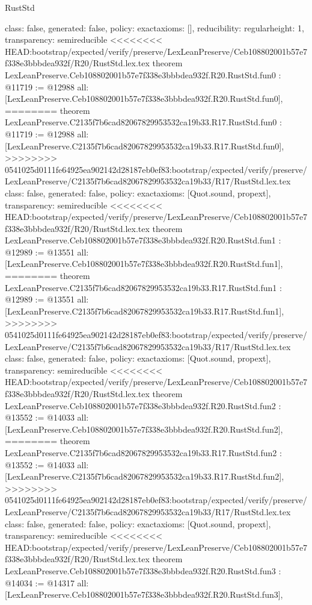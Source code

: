 \begin{lexlean}{RustStd}
\begin{coremodule}
{\begin{coremodule}
{{{  class: false,
  generated: false,
  policy: exact{axioms: []},
  reducibility: regular{height: 1},
  transparency: semireducible
}
<<<<<<<< HEAD:bootstrap/expected/verify/preserve/LexLeanPreserve/Ceb108802001b57e7f338e3bbbdea932f/R20/RustStd.lex.tex
theorem LexLeanPreserve.Ceb108802001b57e7f338e3bbbdea932f.R20.RustStd.fun0 : @11719 := @12988 {
  all: [LexLeanPreserve.Ceb108802001b57e7f338e3bbbdea932f.R20.RustStd.fun0],
========
theorem LexLeanPreserve.C2135f7b6cad82067829953532ca19b33.R17.RustStd.fun0 : @11719 := @12988 {
  all: [LexLeanPreserve.C2135f7b6cad82067829953532ca19b33.R17.RustStd.fun0],
>>>>>>>> 0541025d0111fe64925ea902142d28187eb0ef83:bootstrap/expected/verify/preserve/LexLeanPreserve/C2135f7b6cad82067829953532ca19b33/R17/RustStd.lex.tex
  class: false,
  generated: false,
  policy: exact{axioms: [Quot.sound, propext]},
  transparency: semireducible
}
<<<<<<<< HEAD:bootstrap/expected/verify/preserve/LexLeanPreserve/Ceb108802001b57e7f338e3bbbdea932f/R20/RustStd.lex.tex
theorem LexLeanPreserve.Ceb108802001b57e7f338e3bbbdea932f.R20.RustStd.fun1 : @12989 := @13551 {
  all: [LexLeanPreserve.Ceb108802001b57e7f338e3bbbdea932f.R20.RustStd.fun1],
========
theorem LexLeanPreserve.C2135f7b6cad82067829953532ca19b33.R17.RustStd.fun1 : @12989 := @13551 {
  all: [LexLeanPreserve.C2135f7b6cad82067829953532ca19b33.R17.RustStd.fun1],
>>>>>>>> 0541025d0111fe64925ea902142d28187eb0ef83:bootstrap/expected/verify/preserve/LexLeanPreserve/C2135f7b6cad82067829953532ca19b33/R17/RustStd.lex.tex
  class: false,
  generated: false,
  policy: exact{axioms: [Quot.sound, propext]},
  transparency: semireducible
}
<<<<<<<< HEAD:bootstrap/expected/verify/preserve/LexLeanPreserve/Ceb108802001b57e7f338e3bbbdea932f/R20/RustStd.lex.tex
theorem LexLeanPreserve.Ceb108802001b57e7f338e3bbbdea932f.R20.RustStd.fun2 : @13552 := @14033 {
  all: [LexLeanPreserve.Ceb108802001b57e7f338e3bbbdea932f.R20.RustStd.fun2],
========
theorem LexLeanPreserve.C2135f7b6cad82067829953532ca19b33.R17.RustStd.fun2 : @13552 := @14033 {
  all: [LexLeanPreserve.C2135f7b6cad82067829953532ca19b33.R17.RustStd.fun2],
>>>>>>>> 0541025d0111fe64925ea902142d28187eb0ef83:bootstrap/expected/verify/preserve/LexLeanPreserve/C2135f7b6cad82067829953532ca19b33/R17/RustStd.lex.tex
  class: false,
  generated: false,
  policy: exact{axioms: [Quot.sound, propext]},
  transparency: semireducible
}
<<<<<<<< HEAD:bootstrap/expected/verify/preserve/LexLeanPreserve/Ceb108802001b57e7f338e3bbbdea932f/R20/RustStd.lex.tex
theorem LexLeanPreserve.Ceb108802001b57e7f338e3bbbdea932f.R20.RustStd.fun3 : @14034 := @14317 {
  all: [LexLeanPreserve.Ceb108802001b57e7f338e3bbbdea932f.R20.RustStd.fun3],
}}}}}}
\end{coremodule}}
\end{coremodule}
\end{lexlean}
